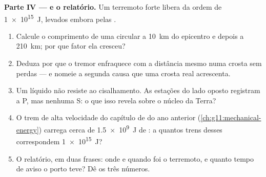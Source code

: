 \begin{problem}
\medskip
\noindent\textbf{Parte IV ---  e o relatório.}
Um terremoto forte libera da ordem de \qty{1e15}{J}, levados embora pelas
.
\begin{enumerate}[resume]
  \item Calcule o comprimento de uma  circular a
        \qty{10}{km} do epicentro e depois a \qty{210}{km}; por que fator
        ela cresceu?
  \item Deduza por que o tremor enfraquece com a distância mesmo numa
        crosta sem perdas --- e nomeie a segunda causa que uma crosta
        real acrescenta.
  \item Um líquido não resiste ao cisalhamento. As estações do lado
        oposto registram a  P, mas nenhuma  S: o que isso revela
        sobre o núcleo da Terra?
  \item O trem de alta velocidade do capítulo de  do ano anterior
        (\cref{ch:g11:mechanical-energy}) carrega cerca de \qty{1.5e9}{J}
        de : a quantos trens desses correspondem
        \qty{1e15}{J}?
  \item O relatório, em duas frases: onde e quando foi o terremoto, e
        quanto tempo de aviso o porto teve? Dê os três números.
\end{enumerate}
\end{problem}
